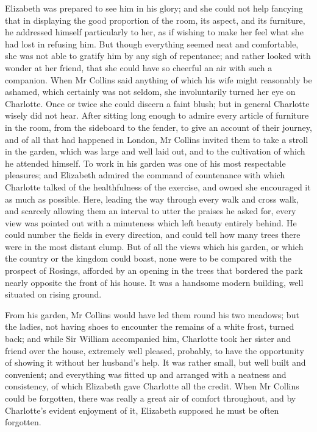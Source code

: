 Elizabeth was prepared to see him in his glory; and she could not help fancying that in displaying the good proportion of the room, its aspect, and its furniture, he addressed himself particularly to her, as if wishing to make her feel what she had lost in refusing him. But though everything seemed neat and comfortable, she was not able to gratify him by any sigh of repentance; and rather looked with wonder at her friend, that she could have so cheerful an air with such a companion. When Mr Collins said anything of which his wife might reasonably be ashamed, which certainly was not seldom, she involuntarily turned her eye on Charlotte. Once or twice she could discern a faint blush; but in general Charlotte wisely did not hear. After sitting long enough to admire every article of furniture in the room, from the sideboard to the fender, to give an account of their journey, and of all that had happened in London, Mr Collins invited them to take a stroll in the garden, which was large and well laid out, and to the cultivation of which he attended himself. To work in his garden was one of his most respectable pleasures; and Elizabeth admired the command of countenance with which Charlotte talked of the healthfulness of the exercise, and owned she encouraged it as much as possible. Here, leading the way through every walk and cross walk, and scarcely allowing them an interval to utter the praises he asked for, every view was pointed out with a minuteness which left beauty entirely behind. He could number the fields in every direction, and could tell how many trees there were in the most distant clump. But of all the views which his garden, or which the country or the kingdom could boast, none were to be compared with the prospect of Rosings, afforded by an opening in the trees that bordered the park nearly opposite the front of his house. It was a handsome modern building, well situated on rising ground.

From his garden, Mr Collins would have led them round his two meadows; but the ladies, not having shoes to encounter the remains of a white frost, turned back; and while Sir William accompanied him, Charlotte took her sister and friend over the house, extremely well pleased, probably, to have the opportunity of showing it without her husband's help. It was rather small, but well built and convenient; and everything was fitted up and arranged with a neatness and consistency, of which Elizabeth gave Charlotte all the credit. When Mr Collins could be forgotten, there was really a great air of comfort throughout, and by Charlotte's evident enjoyment of it, Elizabeth supposed he must be often forgotten.

